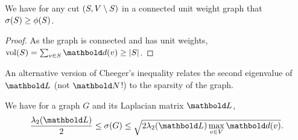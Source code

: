 \begin{lem}
We have for any cut $(S, V \setminus S)$ in a connected unit weight graph that $\sigma(S) \geq \phi(S)$.
\end{lem}
\begin{proof}
As the graph is connected and has unit weights, $\vol(\sS) = \sum_{v \in \sS} \vd(v) \geq |\sS|$.
\end{proof}

An alternative version of Cheeger's inequality relates the second eigenvalue of $\mL$ (not $\mN$!) to the sparsity of the graph.

\begin{thm} We have for a graph $G$ and its Laplacian matrix $\mL$, \begin{align}
    \frac{\lambda_2(\mL)}{2} \leq \sigma(G) \leq \sqrt{2 \lambda_2(\mL) \max_{v \in \sV} \vd(v)}.
\end{align}
\end{thm}